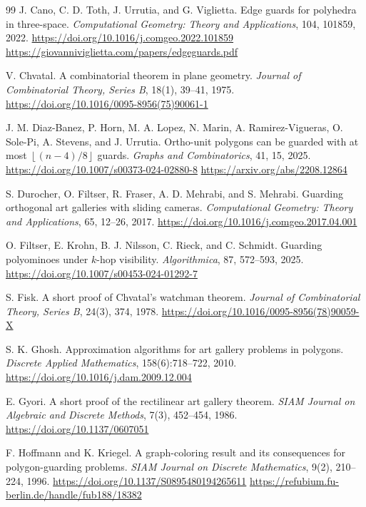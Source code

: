 \documentclass[11pt]{article}
\newcommand{\floor}[1]{\left\lfloor #1 \right\rfloor}
\begin{document}
\begin{thebibliography}{99}
J. Cano, C. D. Toth, J. Urrutia, and G. Viglietta.
\newblock Edge guards for polyhedra in three-space.
\newblock \emph{Computational Geometry: Theory and Applications}, 104, 101859, 2022.
\newblock \url{https://doi.org/10.1016/j.comgeo.2022.101859}
\newblock \url{https://giovanniviglietta.com/papers/edgeguards.pdf}

V. Chvatal.
\newblock A combinatorial theorem in plane geometry.
\newblock \emph{Journal of Combinatorial Theory, Series B}, 18(1), 39--41, 1975.
\newblock \url{https://doi.org/10.1016/0095-8956(75)90061-1}

J. M. Diaz-Banez, P. Horn, M. A. Lopez, N. Marin, A. Ramirez-Vigueras,
O. Sole-Pi, A. Stevens, and J. Urrutia.
\newblock Ortho-unit polygons can be guarded with at most $\floor{(n-4)/8}$ guards.
\newblock \emph{Graphs and Combinatorics}, 41, 15, 2025.
\newblock \url{https://doi.org/10.1007/s00373-024-02880-8}
\newblock \url{https://arxiv.org/abs/2208.12864}

S. Durocher, O. Filtser, R. Fraser, A. D. Mehrabi, and S. Mehrabi.
\newblock Guarding orthogonal art galleries with sliding cameras.
\newblock \emph{Computational Geometry: Theory and Applications}, 65, 12--26, 2017.
\newblock \url{https://doi.org/10.1016/j.comgeo.2017.04.001}

O. Filtser, E. Krohn, B. J. Nilsson, C. Rieck, and C. Schmidt.
\newblock Guarding polyominoes under $k$-hop visibility.
\newblock \emph{Algorithmica}, 87, 572--593, 2025.
\newblock \url{https://doi.org/10.1007/s00453-024-01292-7}

S. Fisk.
\newblock A short proof of Chvatal's watchman theorem.
\newblock \emph{Journal of Combinatorial Theory, Series B}, 24(3), 374, 1978.
\newblock \url{https://doi.org/10.1016/0095-8956(78)90059-X}

S. K. Ghosh.
\newblock Approximation algorithms for art gallery problems in polygons.
\newblock \emph{Discrete Applied Mathematics}, 158(6):718--722, 2010.
\newblock \url{https://doi.org/10.1016/j.dam.2009.12.004}

E. Gyori.
\newblock A short proof of the rectilinear art gallery theorem.
\newblock \emph{SIAM Journal on Algebraic and Discrete Methods}, 7(3), 452--454, 1986.
\newblock \url{https://doi.org/10.1137/0607051}

F. Hoffmann and K. Kriegel.
\newblock A graph-coloring result and its consequences for polygon-guarding problems.
\newblock \emph{SIAM Journal on Discrete Mathematics}, 9(2), 210--224, 1996.
\newblock \url{https://doi.org/10.1137/S0895480194265611}
\newblock \url{https://refubium.fu-berlin.de/handle/fub188/18382}


\end{thebibliography}
\end{document}
